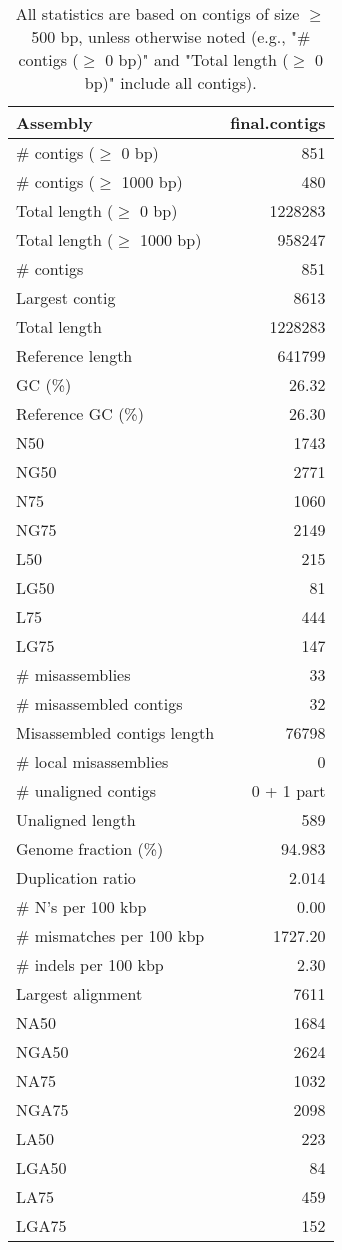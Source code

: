 \documentclass[12pt,a4paper]{article}
\begin{document}
\begin{table}[ht]
\begin{center}
\caption{All statistics are based on contigs of size $\geq$ 500 bp, unless otherwise noted (e.g., "\# contigs ($\geq$ 0 bp)" and "Total length ($\geq$ 0 bp)" include all contigs).}
\begin{tabular}{|l*{1}{|r}|}
\hline
Assembly & final.contigs \\ \hline
\# contigs ($\geq$ 0 bp) & 851 \\ \hline
\# contigs ($\geq$ 1000 bp) & 480 \\ \hline
Total length ($\geq$ 0 bp) & 1228283 \\ \hline
Total length ($\geq$ 1000 bp) & 958247 \\ \hline
\# contigs & 851 \\ \hline
Largest contig & 8613 \\ \hline
Total length & 1228283 \\ \hline
Reference length & 641799 \\ \hline
GC (\%) & 26.32 \\ \hline
Reference GC (\%) & 26.30 \\ \hline
N50 & 1743 \\ \hline
NG50 & 2771 \\ \hline
N75 & 1060 \\ \hline
NG75 & 2149 \\ \hline
L50 & 215 \\ \hline
LG50 & 81 \\ \hline
L75 & 444 \\ \hline
LG75 & 147 \\ \hline
\# misassemblies & 33 \\ \hline
\# misassembled contigs & 32 \\ \hline
Misassembled contigs length & 76798 \\ \hline
\# local misassemblies & 0 \\ \hline
\# unaligned contigs & 0 + 1 part \\ \hline
Unaligned length & 589 \\ \hline
Genome fraction (\%) & 94.983 \\ \hline
Duplication ratio & 2.014 \\ \hline
\# N's per 100 kbp & 0.00 \\ \hline
\# mismatches per 100 kbp & 1727.20 \\ \hline
\# indels per 100 kbp & 2.30 \\ \hline
Largest alignment & 7611 \\ \hline
NA50 & 1684 \\ \hline
NGA50 & 2624 \\ \hline
NA75 & 1032 \\ \hline
NGA75 & 2098 \\ \hline
LA50 & 223 \\ \hline
LGA50 & 84 \\ \hline
LA75 & 459 \\ \hline
LGA75 & 152 \\ \hline
\end{tabular}
\end{center}
\end{table}
\end{document}
